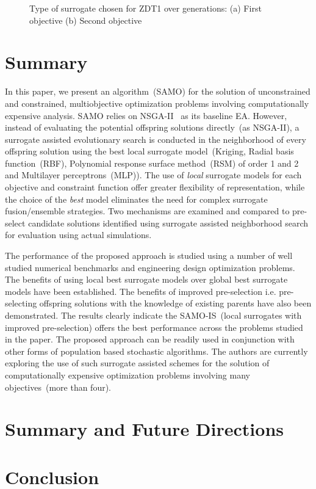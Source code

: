 \begin{figure}[!htb] \centering
	\caption{Type of surrogate chosen for ZDT1 over generations: (a) First objective (b) Second objective}
	\label{fig:zdt1_type} \end{figure}    

\section{Summary} \label{sec:conclusion} In this paper, we present an algorithm~(SAMO) for the
solution of unconstrained and constrained, multiobjective optimization problems involving
computationally expensive analysis. SAMO relies on NSGA-II~\cite{deb2002fae} as its baseline EA.
However, instead of evaluating the potential offspring solutions directly~(as NSGA-II), a surrogate
assisted evolutionary search is conducted in the neighborhood of every offspring solution using the
best local surrogate model~(Kriging, Radial basis function~(RBF), Polynomial response surface
method~(RSM) of order 1 and 2 and Multilayer perceptrons~(MLP)). The use of \textit{local} surrogate
models for each objective and constraint function offer greater flexibility of representation, while
the choice of the \textit{best} model eliminates the need for complex surrogate fusion/ensemble
strategies. Two mechanisms are examined and compared to pre-select candidate solutions identified
using surrogate assisted neighborhood search for evaluation using actual simulations.

The performance of the proposed approach is studied using a number of well studied numerical
benchmarks and engineering design optimization problems. The benefits of using local best surrogate
models over global best surrogate models have been established. The benefits of improved
pre-selection i.e. pre-selecting offspring solutions with the knowledge of existing parents have also been demonstrated. 
The results clearly indicate the SAMO-IS~(local surrogates with improved pre-selection) offers the best performance
across the problems studied in the paper. The proposed approach can be readily used in conjunction with other
forms of population based stochastic algorithms. The authors are currently exploring the use of such surrogate assisted
schemes for the solution of computationally expensive optimization problems involving 
many objectives~(more than four).

\section{Summary and Future Directions}
\label{sec:sum}


\section{Conclusion}
\label{sec:conc}


\small
